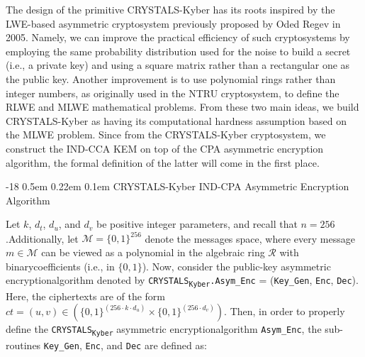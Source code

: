 \documentclass[runningheads]{llncs}
\makeatletter
\renewcommand\subsubsection{\@startsection{subsubsection}{3}{\z@}%
                       {-18\p@ \@plus -4\p@ \@minus -4\p@}%
                       {0.5em \@plus 0.22em \@minus 0.1em}%
                       {\normalfont\normalsize\bfseries\boldmath}}
\numberwithin{equation}{section}
\makeatother
\begin{document}
    \vspace{-3ex}
    \noindent The design of the primitive CRYSTALS-Kyber has its roots inspired by the LWE-based asymmetric cryptosystem previously proposed by Oded Regev in 2005. Namely, we can improve the practical efficiency of such cryptosystems by employing the same probability distribution used for the noise to build a secret (i.e., a private key) and using a square matrix rather than a rectangular one as the public key. Another improvement is to use polynomial rings rather than integer numbers, as originally used in the NTRU cryptosystem, to define the RLWE and MLWE mathematical problems. From these two main ideas, we build CRYSTALS-Kyber as having its computational hardness assumption based on the MLWE problem. Since from the CRYSTALS-Kyber cryptosystem, we construct the IND-CCA KEM on top of the CPA asymmetric encryption algorithm, the formal definition of the latter will come in the first place.


    \subsubsection{CRYSTALS-Kyber IND-CPA Asymmetric Encryption\\ Algorithm}
    \label{subsubsec:crystals-kyber-ind-cpa-asymmetric-encryption-algorithm}

    Let $k$, ${d}_{t}$, ${d}_{u}$, and ${d}_{v}$ be positive integer parameters, and recall that $n = 256$.\break Additionally, let $\mathcal{M} = { \{ 0 , 1 \} }^{256}$ denote the messages space, where every message\break $m \in \mathcal{M}$ can be viewed as a polynomial in the algebraic ring $\mathcal{R}$ with binary\break coefficients (i.e., in $\{ 0 , 1 \}$). Now, consider the public-key asymmetric encryption\break algorithm denoted by \texorpdfstring{\texttt{CRYSTALS}\textsubscript{\texttt{Kyber}}\texttt{.Asym\_Enc} = \big(\texttt{Key\_Gen}, \texttt{Enc}, \texttt{Dec}\big)}\/. Here, the ciphertexts are of the form $ ct = (u, v) \in \left( { \{ 0, 1 \} }^{\left( 256 \cdot k \cdot {d}_{u} \right)} \times { \{ 0, 1 \} }^{\left( 256 \cdot {d}_{v} \right)} \right)$. Then, in order to properly define the \texorpdfstring{\texttt{CRYSTALS}\textsubscript{\texttt{Kyber}}}\/ asymmetric encryption\break algorithm \texttt{Asym\_Enc}, the sub-routines \texttt{Key\_Gen}, \texttt{Enc}, and \texttt{Dec} are defined as:
\end{document}
